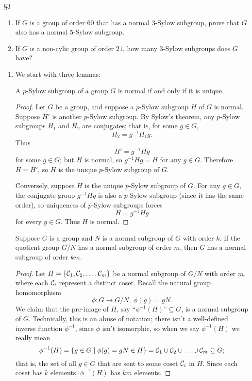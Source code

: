\documentclass{homework}
\begin{document}
\begin{problem}{\S 3}
  \begin{enumerate}[label=(\alph*)]
    \item If $G$ is a group of order $60$ that has a normal $3$-Sylow subgroup, prove that $G$ also
      has a normal $5$-Sylow subgroup.
    \item If $G$ is a non-cylic group of order $21$, how many $3$-Sylow subgroups does $G$ have?
  \end{enumerate}
\end{problem}

\begin{solution}
  \begin{enumerate}[label=(\alph*)]
    \item 
      We start with three lemmas:
      \begin{lemma}{}
        A $p$-Sylow subgroup of a group $G$ is normal if and only if it is unique.
      \end{lemma}
      \begin{proof}[Proof]
        Let $G$ be a group, and suppose a $p$-Sylow subgroup $H$ of $G$ is normal. Suppose $H'$ is 
        another $p$-Sylow subgroup. By Sylow's theorem, any $p$-Sylow subgroups $H_1$ and $H_2$ are
        conjugates; that is, for some $g\in G$, \[
          H_2=g^{-1}H_1g
        .\] Thus \[
          H'=g^{-1}Hg
        \] for some $g\in G$; but $H$ is normal, so $g^{-1}Hg=H$ for any $g\in G$. Therefore $H=H'$, so
        $H$ is the unique $p$-Sylow subgroup of $G$.

        Conversely, suppose $H$ is the unique $p$-Sylow subgroup of $G$. For any $g\in G$, the conjugate
        group $g^{-1}Hg$ is also a $p$-Sylow subgroup (since it has the same order), so uniqueness of
        $p$-Sylow subgroups forces \[
          H=g^{-1}Hg
        \] for every $g\in G$. Thus $H$ is normal.
      \end{proof}
      \begin{lemma}{}
        Suppose $G$ is a group and $N$ is a normal subgroup of $G$ with order $k$. If the quotient group
        $G / N$ has a normal subgroup of order $m$, then $G$ has a normal subgroup of order $km$.
      \end{lemma}
      \begin{proof}[Proof]
        Let $H=\{ \mathcal{C}_1,\mathcal{C}_2,\ldots,\mathcal{C}_m \}$ be a normal subgroup of $G /N$ with order $m$,
        where each $\mathcal{C}_i$ represent a distinct coset. Recall the natural group homomorphism \[
          \phi:G\longrightarrow G / N,\ \phi(g)=gN
        .\] We claim that the pre-image of $H$, say ``$\phi^{-1}(H)$''$\subseteq G$, is a normal
        subgroup of $G$. Technically, this is an abuse of notation; there isn't a well-defined inverse
        function $\phi^{-1}$, since $\phi$ isn't isomorphic, so when we say $\phi^{-1}(H)$ we really
        mean \[
          \phi^{-1}(H)=\{g\in G\mid \phi(g)=gN\in H\} =\mathcal{C}_1\cup \mathcal{C}_2\cup \ldots\cup
          \mathcal{C}_m \subseteq G
        ;\] that is, the set of all $g\in G$ that are sent to some coset $\mathcal{C}_i$ in $H$. Since each
        coset has $k$ elements, $\phi^{-1}(H)$ has $km$ elements.


\end{proof}
\end{enumerate}
\end{solution}
\end{document}
